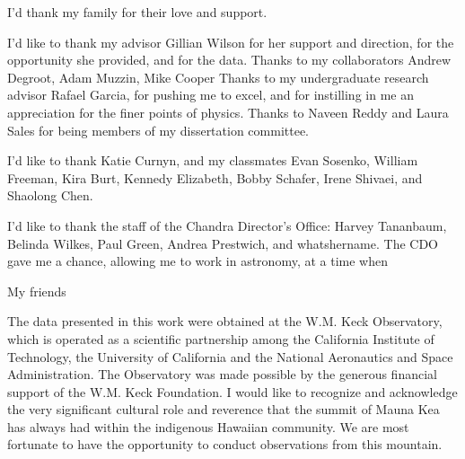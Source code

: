 \begin{acknowledgements}


I'd thank my family for their love and support.

I'd like to thank my advisor Gillian Wilson for her support and direction, for the opportunity she provided, and for the data.
Thanks to my collaborators Andrew Degroot, Adam Muzzin, Mike Cooper
Thanks to my undergraduate research advisor Rafael Garcia, for pushing me to excel, and for instilling in me an appreciation for the finer points of physics.
Thanks to Naveen Reddy and Laura Sales for being members of my dissertation committee.

I'd like to thank Katie Curnyn, and my classmates Evan Sosenko, William Freeman, Kira Burt, Kennedy Elizabeth, Bobby Schafer, Irene Shivaei, and Shaolong Chen.

I'd like to thank the staff of the Chandra Director's Office: Harvey Tananbaum, Belinda Wilkes, Paul Green, Andrea Prestwich, and whatshername.
The CDO gave me a chance, allowing me to work in astronomy, at a time when

My friends

The data presented in this work were obtained at the W.M. Keck Observatory, which is operated as a scientific partnership among the California Institute of Technology, the University of California and the National Aeronautics and Space Administration. The Observatory was made possible by the generous financial support of the W.M. Keck Foundation. I would like to recognize and acknowledge the very significant cultural role and reverence that the summit of Mauna Kea has always had within the indigenous Hawaiian community.  We are most fortunate to have the opportunity to conduct observations from this mountain.

\end{acknowledgements}
